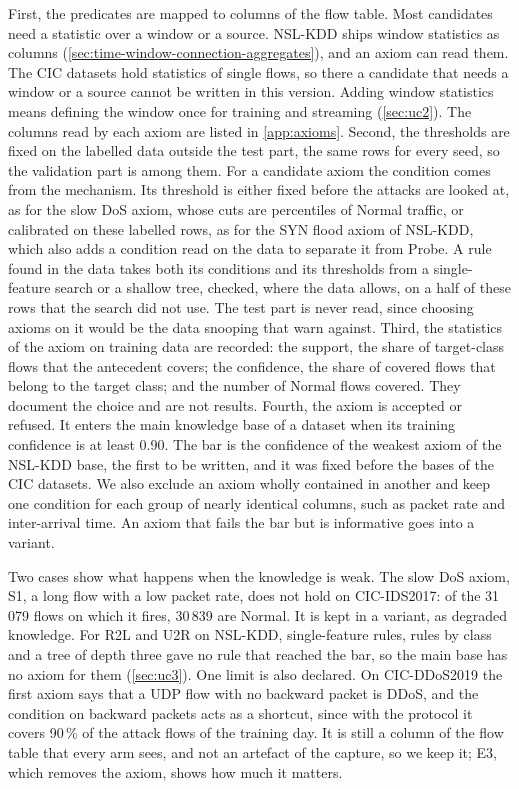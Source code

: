First, the predicates are mapped to columns of the flow table. Most candidates need
a statistic over a window or a source. NSL-KDD ships window statistics as columns
(\cref{sec:time-window-connection-aggregates}), and an axiom can read them. The CIC
datasets hold statistics of single flows, so there a candidate that needs a window or
a source cannot be written in this version. Adding window statistics means defining
the window once for training and streaming (\cref{sec:uc2}). The columns read by each
axiom are listed in \cref{app:axioms}.
Second, the thresholds are fixed on the labelled data outside the test part, the same
rows for every seed, so the validation part is among them. For a candidate axiom the
condition comes from the mechanism. Its threshold is
either fixed before the attacks are looked at, as for the slow DoS axiom, whose cuts
are percentiles of Normal traffic, or calibrated on these labelled rows, as
for the SYN flood axiom of NSL-KDD, which also adds a condition read on the data to
separate it from Probe. A rule found in the data takes both its
conditions and its thresholds from a single-feature search or a shallow tree, checked,
where the data allows, on a half of these rows that the search did not use.
The test part is never read, since choosing axioms on it would be the data snooping
that \citet{arp2022dosdonts} warn against. Third, the statistics of the axiom on
training data are recorded: the support, the share of target-class flows that the
antecedent covers; the confidence, the share of covered flows that belong to the
target class; and the number of Normal flows covered. They document the choice and
are not results. Fourth, the axiom is accepted or refused. It enters the main
knowledge base of a dataset when its training confidence is at least 0.90. The bar is
the confidence of the weakest axiom of the NSL-KDD base, the first to be written, and
it was fixed before the bases of the CIC datasets. We also exclude an axiom wholly
contained in another and keep one condition for each group of nearly identical
columns, such as packet rate and inter-arrival time. An axiom that fails the bar but
is informative goes into a variant.

Two cases show what happens when the knowledge is weak. The slow DoS axiom, S1, a
long flow with a low packet rate, does not hold on CIC-IDS2017: of the 31\,079
flows on which it fires, 30\,839 are Normal. It is kept in a variant, as degraded
knowledge. For R2L and U2R on NSL-KDD, single-feature rules, rules by class and a
tree of depth three gave no rule that reached the bar, so the main base has no axiom
for them (\cref{sec:uc3}). One limit is also declared. On CIC-DDoS2019 the first
axiom says that a UDP flow with no backward packet is DDoS, and the condition on
backward packets acts as a shortcut, since with the protocol it covers 90\,\% of the
attack flows of the training day. It is
still a column of the flow table that every arm sees, and not an artefact of the
capture, so we keep it; E3, which removes the axiom, shows how much it matters.

